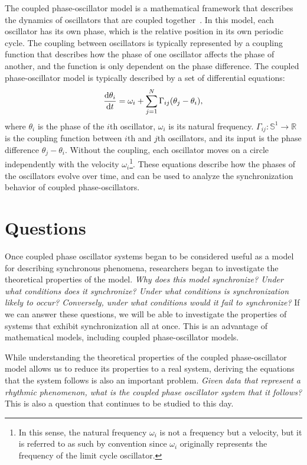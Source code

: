 The coupled phase-oscillator model is a mathematical framework that describes the dynamics of oscillators that are coupled together~\cite{strogatz2000,kuramoto1975,kori2011}.
In this model, each oscillator has its own phase, which is the relative position in its own periodic cycle.
The coupling between oscillators is typically represented by a coupling function that describes how the phase of one oscillator affects the phase of another, and the function is only dependent on the phase difference.
The coupled phase-oscillator model is typically described by a set of differential equations:
\begin{align}
\frac{\mathrm{d}\theta_{i}}{\mathrm{d} t}=\omega_{i}+\sum_{j=1}^{N}\Gamma_{ij}(\theta_{j}-\theta_{i}),
\end{align}
where $\theta_i$ is the phase of the $i$th oscillator, $\omega_i$ is its natural frequency.
$\Gamma_{ij}\colon\mathbb{S}^{1}\to\mathbb{R}$ is the coupling function between $i$th and $j$th oscillators, and its input is the phase difference $\theta_{j}-\theta_{i}$.
Without the coupling, each oscillator moves on a circle independently with the velocity $\omega_{i}$\footnote{In this sense, the natural frequency $\omega_{i}$ is not a frequency but a velocity, but it is referred to as such by convention since $\omega_{i}$ originally represents the frequency of the limit cycle oscillator.}.
These equations describe how the phases of the oscillators evolve over time, and can be used to analyze the synchronization behavior of coupled phase-oscillators.

\section{Questions}

Once coupled phase oscillator systems began to be considered useful as a model for describing synchronous phenomena, researchers began to investigate the theoretical properties of the model. 
\textit{Why does this model synchronize? Under what conditions does it synchronize? Under what conditions is synchronization likely to occur? Conversely, under what conditions would it fail to synchronize?}
If we can answer these questions, we will be able to investigate the properties of systems that exhibit synchronization all at once. This is an advantage of mathematical models, including coupled phase-oscillator models.

While understanding the theoretical properties of the coupled phase-oscillator model allows us to reduce its properties to a real system, deriving the equations that the system follows is also an important problem. \textit{Given data that represent a rhythmic phenomenon, what is the coupled phase oscillator system that it follows?}
This is also a question that continues to be studied to this day.

